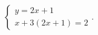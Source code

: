$\displaystyle
\left\{
\begin{array}{l}
\displaystyle y = 2x + 1 \\
\displaystyle x + 3(2x+1) = 2
\end{array}
\right.
$.
% 
